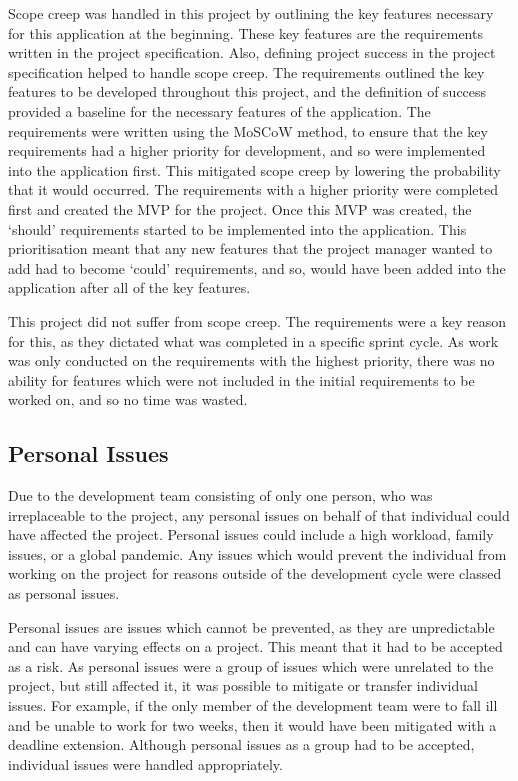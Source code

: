 \documentclass{article}
\begin{document}
Scope creep was handled in this project by outlining the key features necessary for this application at the beginning. These key features are the requirements written in the project specification. Also, defining project success in the project specification helped to handle scope creep. The requirements outlined the key features to be developed throughout this project, and the definition of success provided a baseline for the necessary features of the application. The requirements were written using the MoSCoW method, to ensure that the key requirements had a higher priority for development, and so were implemented into the application first. This mitigated scope creep by lowering the probability that it would occurred. The requirements with a higher priority were completed first and created the MVP for the project. Once this MVP was created, the `should' requirements started to be implemented into the application. This prioritisation meant that any new features that the project manager wanted to add had to become `could' requirements, and so, would have been added into the application after all of the key features. \par

This project did not suffer from scope creep. The requirements were a key reason for this, as they dictated what was completed in a specific sprint cycle. As work was only conducted on the requirements with the highest priority, there was no ability for features which were not included in the initial requirements to be worked on, and so no time was wasted. \par

\subsection{Personal Issues}

Due to the development team consisting of only one person, who was irreplaceable to the project, any personal issues on behalf of that individual could have affected the project. Personal issues could include a high workload, family issues, or a global pandemic. Any issues which would prevent the individual from working on the project for reasons outside of the development cycle were classed as personal issues. \par

Personal issues are issues which cannot be prevented, as they are unpredictable and can have varying effects on a project. This meant that it had to be accepted as a risk. As personal issues were a group of issues which were unrelated to the project, but still affected it, it was possible to mitigate or transfer individual issues. For example, if the only member of the development team were to fall ill and be unable to work for two weeks, then it would have been mitigated with a deadline extension. Although personal issues as a group had to be accepted, individual issues were handled appropriately. \par
\end{document}
